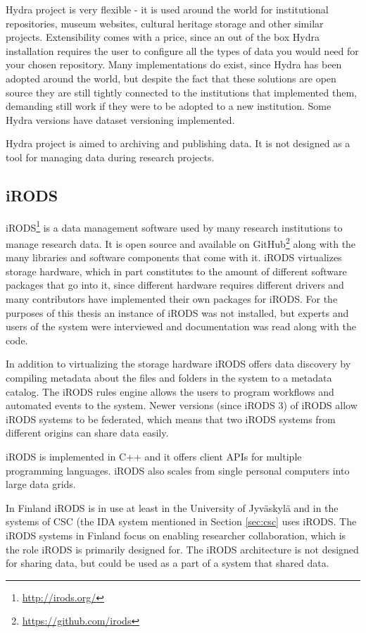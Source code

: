 Hydra project is very flexible - it is used around the world for institutional
repositories, museum websites, cultural heritage storage and other similar
projects. Extensibility comes with a price, since an out of the box Hydra
installation requires the user to configure all the types of data you would
need for your chosen repository. Many implementations do exist, since Hydra
has been adopted around the world, but despite the fact that these solutions
are open source they are still tightly connected to the institutions that
implemented them, demanding still work if they were to be adopted to a new
institution. Some Hydra versions have dataset versioning implemented.

Hydra project is aimed to archiving and publishing data. It is not designed as
a tool for managing data during research projects.

\subsection{iRODS}

iRODS\footnote{\url{http://irods.org/}} is a data management software used by many research institutions to
manage research data. It is open source and available on GitHub\footnote{\url{https://github.com/irods}}
along with the many libraries and software components that come with it. iRODS
virtualizes storage hardware, which in part constitutes to the amount of
different software packages that go into it, since different hardware requires
different drivers and many contributors have implemented their own packages for
iRODS. For the purposes of this thesis an instance of iRODS was not installed,
but experts and users of the system were interviewed and documentation was read
along with the code.

In addition to virtualizing the storage hardware iRODS offers data discovery
by compiling metadata about the files and folders in the system to a metadata
catalog. The iRODS rules engine allows the users to program workflows and
automated events to the system. Newer versions (since iRODS 3) of iRODS allow
iRODS systems to be federated, which means that two iRODS systems from
different origins can share data easily.

iRODS is implemented in C++ and it offers client APIs for multiple programming
languages. iRODS also scales from single personal computers into large data
grids.

In Finland iRODS is in use at least in the University of Jyväskylä and in the
systems of CSC (the IDA system mentioned in Section \ref{sec:csc} uses iRODS.
The iRODS systems in Finland focus on enabling researcher collaboration, which
is the role iRODS is primarily designed for. The iRODS architecture is not
designed for sharing data, but could be used as a part of a system that shared
data.

